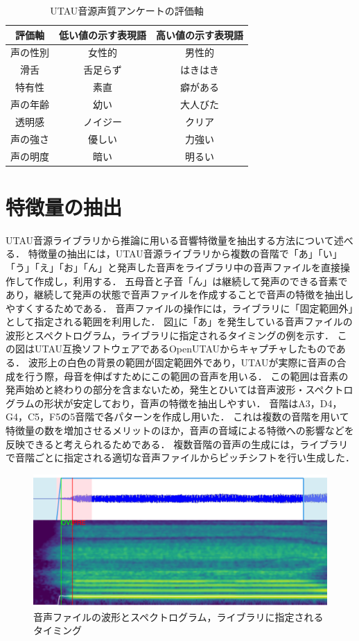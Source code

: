 \begin{table}[htb]
  \centering
  \caption{UTAU音源声質アンケートの評価軸}
  \label{tab:survey}
  \begin{tabular}{c|cc}
    \hline
    評価軸 & 低い値の示す表現語 & 高い値の示す表現語 \\
    \hline
    声の性別 & 女性的 & 男性的 \\
    滑舌 & 舌足らず & はきはき \\
    特有性 & 素直 & 癖がある \\
    声の年齢 & 幼い & 大人びた \\
    透明感 & ノイジー & クリア \\
    声の強さ & 優しい & 力強い \\
    声の明度 & 暗い & 明るい \\
    \hline
  \end{tabular}
\end{table}

\section{特徴量の抽出}
\label{sec:feature}

UTAU音源ライブラリから推論に用いる音響特徴量を抽出する方法について述べる．
特徴量の抽出には，UTAU音源ライブラリから複数の音階で「あ」「い」「う」「え」「お」「ん」と発声した音声をライブラリ中の音声ファイルを直接操作して作成し，利用する．
五母音と子音「ん」は継続して発声のできる音素であり，継続して発声の状態で音声ファイルを作成することで音声の特徴を抽出しやすくするためである．
音声ファイルの操作には，ライブラリに「固定範囲外」として指定される範囲を利用した．
図\ref{fig:waveform}に「あ」を発生している音声ファイルの波形とスペクトログラム，ライブラリに指定されるタイミングの例を示す．
この図はUTAU互換ソフトウェアであるOpenUTAUからキャプチャしたものである．
波形上の白色の背景の範囲が固定範囲外であり，UTAUが実際に音声の合成を行う際，母音を伸ばすためにこの範囲の音声を用いる．
この範囲は音素の発声始めと終わりの部分を含まないため，発生とひいては音声波形・スペクトログラムの形状が安定しており，音声の特徴を抽出しやすい．
音階はA3，D4，G4，C5，F5の5音階で各パターンを作成し用いた．
これは複数の音階を用いて特徴量の数を増加させるメリットのほか，音声の音域による特徴への影響などを反映できると考えられるためである．
複数音階の音声の生成には，ライブラリで音階ごとに指定される適切な音声ファイルからピッチシフトを行い生成した．

\begin{figure}[htb]
  \centering
  \includegraphics[width=0.9\linewidth]{fig/eve_a.png}
  \caption{音声ファイルの波形とスペクトログラム，ライブラリに指定されるタイミング}
  \label{fig:waveform}
\end{figure}

